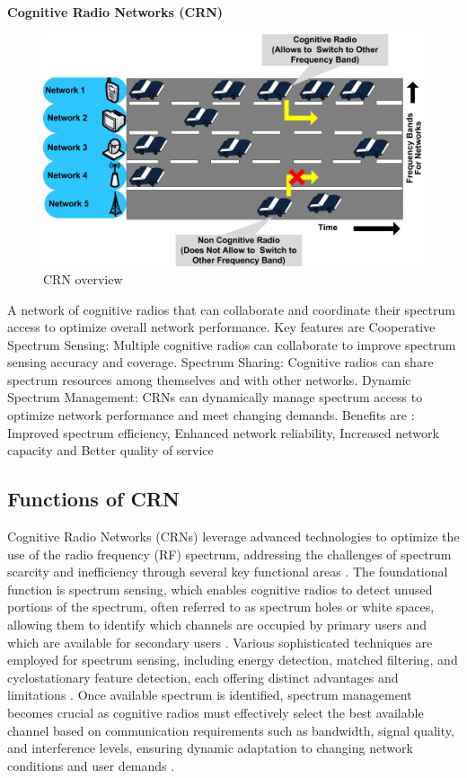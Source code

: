 \textbf{Cognitive Radio Networks (CRN)}

\begin{figure}
    \centering
    \includegraphics[width=0.8\linewidth]{Figures/chapter1/CRN overview.jpg}
    \caption{CRN overview \cite{ref27}}
    \label{fig:crn}
\end{figure}

A network of cognitive radios that can collaborate and coordinate their spectrum access to optimize overall network performance.
    Key features \cite{ref1} are Cooperative Spectrum Sensing: Multiple cognitive radios can collaborate to improve spectrum sensing accuracy and coverage.
        Spectrum Sharing: Cognitive radios can share spectrum resources among themselves and with other networks.
        Dynamic Spectrum Management: CRNs can dynamically manage spectrum access to optimize network performance and meet changing demands.
    Benefits are : Improved spectrum efficiency, Enhanced network reliability, Increased network capacity and Better quality of service
 
\subsection{\textbf{Functions of CRN}}

Cognitive Radio Networks (CRNs) leverage advanced technologies to optimize the use of the radio frequency (RF) spectrum, addressing the challenges of spectrum scarcity and inefficiency through several key functional areas \cite{ref1}. The foundational function is spectrum sensing, which enables cognitive radios to detect unused portions of the spectrum, often referred to as spectrum holes or white spaces, allowing them to identify which channels are occupied by primary users and which are available for secondary users \cite{ref1,ref6}. Various sophisticated techniques are employed for spectrum sensing, including energy detection, matched filtering, and cyclostationary feature detection, each offering distinct advantages and limitations \cite{ref4,ref6}. Once available spectrum is identified, spectrum management becomes crucial as cognitive radios must effectively select the best available channel based on communication requirements such as bandwidth, signal quality, and interference levels, ensuring dynamic adaptation to changing network conditions and user demands \cite{ref1,ref3}.

